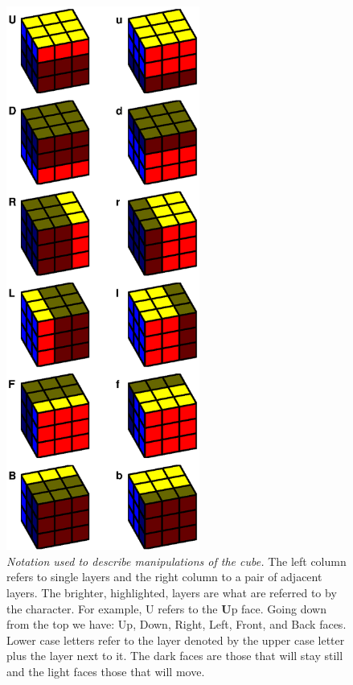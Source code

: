 \documentclass[paper=a4, fontsize=11pt, parskip=full]{scrartcl} %
\newcommand*{\A}{\fontfamily{pcr}\selectfont} %
\newcommand{\2}{\ensuremath{^2}} %
\begin{document}
\begin{figure}
\centering
\includegraphics[width=2.5in]{faceNotation.eps}
\caption{\textit{Notation used to describe manipulations of the cube.} The left 
column refers to single layers and the right column to a pair of adjacent layers. The
brighter, highlighted, layers are what are referred to by the character. For example,
{\A U} refers to the \textbf{U}p face. Going down from the top we have: Up, Down,
Right, Left, Front, and Back faces. Lower case letters refer to the 
layer denoted by the upper case letter plus the layer next to it. The dark faces are
those that will stay still and the light faces those that will move.}
\label{fig:faceNotation}
\end{figure}

\clearpage
\end{document}
